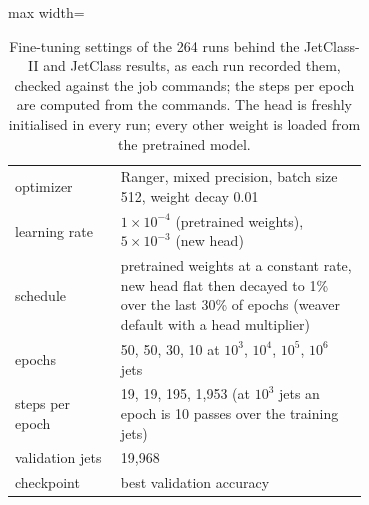 \begin{table}[t]
\centering
\small
\setlength{\tabcolsep}{4pt}
\caption{Fine-tuning settings of the 264 runs behind the JetClass-II and JetClass results, as each run recorded them, checked against the job commands; the steps per epoch are computed from the commands. The head is freshly initialised in every run; every other weight is loaded from the pretrained model.}
\label{tab:ftrecipe}
\begin{adjustbox}{max width=\linewidth}
\begin{tabular}{l p{0.7\linewidth}}
\toprule
optimizer & Ranger, mixed precision, batch size 512, weight decay 0.01 \\
learning rate & $1\times10^{-4}$ (pretrained weights), $5\times10^{-3}$ (new head) \\
schedule & pretrained weights at a constant rate, new head flat then decayed to 1\% over the last 30\% of epochs (weaver default with a head multiplier) \\
epochs & 50, 50, 30, 10 at $10^{3}$, $10^{4}$, $10^{5}$, $10^{6}$ jets \\
steps per epoch & 19, 19, 195, 1{,}953 (at $10^{3}$ jets an epoch is 10 passes over the training jets) \\
validation jets & 19{,}968 \\
checkpoint & best validation accuracy \\
\bottomrule
\end{tabular}
\end{adjustbox}
\end{table}
